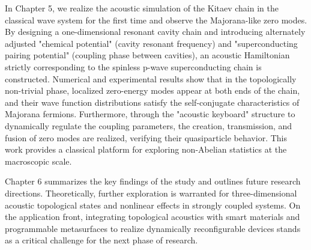 \documentclass[
    anonymous,              %
    type = doctor,
  ]{njuthesis}
\begin{document}
\begin{abstract*}
  In Chapter 5, we realize the acoustic simulation of the Kitaev chain in the classical wave system for the first time and observe the Majorana-like zero modes. By designing a one-dimensional resonant cavity chain and introducing alternately adjusted "chemical potential" (cavity resonant frequency) and "superconducting pairing potential" (coupling phase between cavities), an acoustic Hamiltonian strictly corresponding to the spinless p-wave superconducting chain is constructed. Numerical and experimental results show that in the topologically non-trivial phase, localized zero-energy modes appear at both ends of the chain, and their wave function distributions satisfy the self-conjugate characteristics of Majorana fermions. Furthermore, through the "acoustic keyboard" structure to dynamically regulate the coupling parameters, the creation, transmission, and fusion of zero modes are realized, verifying their quasiparticle behavior. This work provides a classical platform for exploring non-Abelian statistics at the macroscopic scale.
  
	Chapter 6 summarizes the key findings of the study and outlines future research directions. Theoretically, further exploration is warranted for three-dimensional acoustic topological states and nonlinear effects in strongly coupled systems. On the application front, integrating topological acoustics with smart materials and programmable metasurfaces to realize dynamically reconfigurable devices stands as a critical challenge for the next phase of research.
\end{abstract*}

\tableofcontents

\mainmatter








\end{document}
